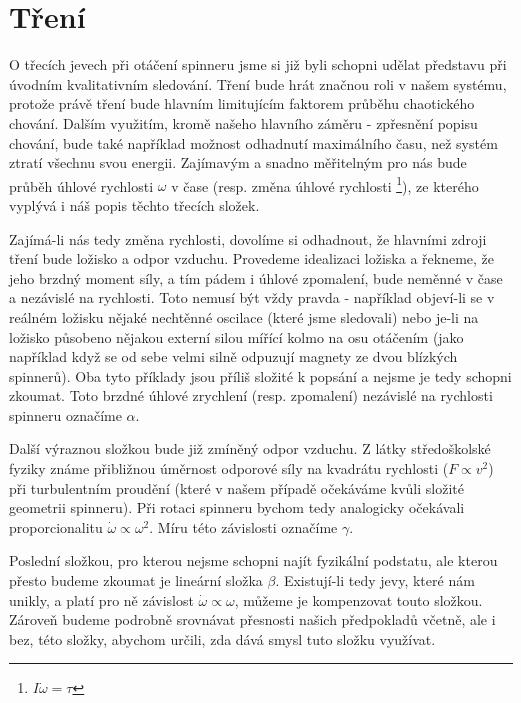 \chapter{Tření}
\label{chap:drag}

O třecích jevech při otáčení spinneru jsme si již byli schopni udělat představu při úvodním kvalitativním sledování. Tření bude hrát značnou roli v našem systému, protože právě tření bude hlavním limitujícím faktorem průběhu chaotického chování. Dalším využitím, kromě našeho hlavního záměru - zpřesnění popisu chování, bude také například možnost odhadnutí maximálního času, než systém ztratí všechnu svou energii. Zajímavým a snadno měřitelným pro nás bude průběh úhlové rychlosti $\omega$ v čase (resp. změna úhlové rychlosti \footnote{$I\dot{\omega} = \tau$}), ze kterého vyplývá i náš popis těchto třecích složek.

Zajímá-li nás tedy změna rychlosti, dovolíme si odhadnout, že hlavními zdroji tření bude ložisko a odpor vzduchu. Provedeme idealizaci ložiska a řekneme, že jeho brzdný moment síly, a tím pádem i úhlové zpomalení, bude neměnné v čase a nezávislé na rychlosti. Toto nemusí být vždy pravda - například objeví-li se v reálném ložisku nějaké nechtěnné oscilace (které jsme sledovali) nebo je-li na ložisko působeno nějakou externí silou mířící kolmo na osu otáčením (jako například když se od sebe velmi silně odpuzují magnety ze dvou blízkých spinnerů). Oba tyto příklady jsou příliš složité k popsání a nejsme je tedy schopni zkoumat. Toto brzdné úhlové zrychlení (resp. zpomalení) nezávislé na rychlosti spinneru označíme $\alpha$.

Další výraznou složkou bude již zmíněný odpor vzduchu. Z látky středoškolské fyziky známe přibližnou úměrnost odporové síly na kvadrátu rychlosti ($F \propto v^2$) při turbulentním proudění (které v našem případě očekáváme kvůli složité geometrii spinneru). Při rotaci spinneru bychom tedy analogicky očekávali proporcionalitu $\dot{\omega} \propto \omega^2$. Míru této závislosti označíme $\gamma$.

Poslední složkou, pro kterou nejsme schopni najít fyzikální podstatu, ale kterou přesto budeme zkoumat je lineární složka $\beta$. Existují-li tedy jevy, které nám unikly, a platí pro ně závislost $\dot{\omega} \propto \omega$, můžeme je kompenzovat touto složkou. Zároveň budeme podrobně srovnávat přesnosti našich předpokladů včetně, ale i bez, této složky, abychom určili, zda dává smysl tuto složku využívat.

\clearpage

